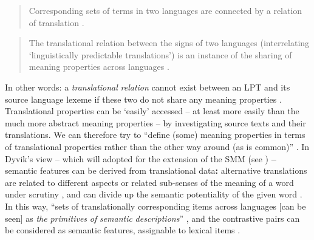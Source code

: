 \begin{quote}
Corresponding sets of terms in two languages are connected by a relation of translation \citep[29]{langemets_translations_2005}.
\end{quote}

\begin{quote}
The translational relation between the signs of two languages (interrelating ‘linguistically predictable translations’) is an instance of the sharing of meaning properties across languages \citep[217]{hasselgard_complexity_1999}.
\end{quote}

In other words: a \textit{translational} \textit{relation} cannot exist between an LPT and its source language lexeme if these two do not share any meaning properties \citep[218]{hasselgard_complexity_1999}. Translational properties can be ‘easily’ accessed – at least more easily than the much more abstract meaning properties – by investigating source texts and their translations. We can therefore  try to “define (some) meaning properties in terms of translational properties rather than the other way around (as is common)” \citep[218]{hasselgard_complexity_1999}. In Dyvik’s view – which will adopted for the extension of the SMM (see ) \textbf{–} semantic features can be derived from translational data\textbf{:} alternative translations are related to different aspects or related sub-senses of the meaning of a word under scrutiny \citep[31]{langemets_translations_2005}, and can divide up the semantic potentiality of the given word \citep[31]{langemets_translations_2005}. In this way, “sets of translationally corresponding items across languages [can be seen] as \textit{the} \textit{primitives} \textit{of} \textit{semantic} \textit{descriptions}” \citep[31]{langemets_translations_2005}, and the contrastive pairs can be considered as semantic features, assignable to lexical items \citep[31]{langemets_translations_2005}.

